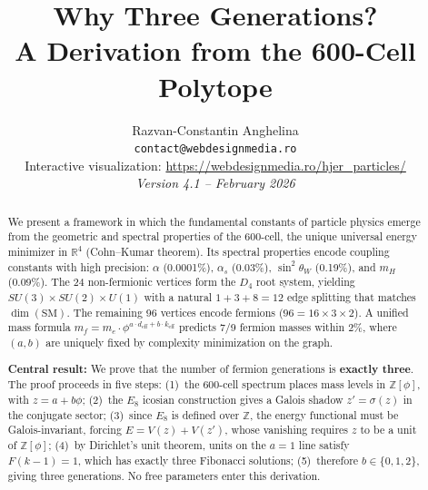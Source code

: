\documentclass[12pt,a4paper]{article}
\title{\textbf{Why Three Generations?\\
A Derivation from the 600-Cell Polytope}}
\author{
Razvan-Constantin Anghelina\\
\texttt{contact@webdesignmedia.ro}\\[0.3em]
Interactive visualization: \url{https://webdesignmedia.ro/hjer_particles/}\\[1em]
\textit{Version 4.1 -- February 2026}
}
\date{}
\begin{document}
\maketitle

\begin{abstract}
We present a framework in which the fundamental constants of particle physics emerge from the geometric and spectral properties of the 600-cell, the unique universal energy minimizer in $\mathbb{R}^4$ (Cohn--Kumar theorem). Its spectral properties encode coupling constants with high precision: $\alpha$ (0.0001\%), $\alpha_s$ (0.03\%), $\sin^2\theta_W$ (0.19\%), and $m_H$ (0.09\%). The 24 non-fermionic vertices form the $D_4$ root system, yielding $SU(3) \times SU(2) \times U(1)$ with a natural $1 + 3 + 8 = 12$ edge splitting that matches $\dim(\text{SM})$. The remaining 96 vertices encode fermions ($96 = 16 \times 3 \times 2$). A unified mass formula $m_f = m_e \cdot \phi^{a \cdot d_{\text{eff}} + b \cdot k_{\text{eff}}}$ predicts 7/9 fermion masses within 2\%, where $(a,b)$ are uniquely fixed by complexity minimization on the graph.

\textbf{Central result:} We prove that the number of fermion generations is \textbf{exactly three}. The proof proceeds in five steps: (1)~the 600-cell spectrum places mass levels in $\mathbb{Z}[\phi]$, with $z = a + b\phi$; (2)~the $E_8$ icosian construction gives a Galois shadow $z' = \sigma(z)$ in the conjugate sector; (3)~since $E_8$ is defined over $\mathbb{Z}$, the energy functional must be Galois-invariant, forcing $E = V(z) + V(z')$, whose vanishing requires $z$ to be a unit of $\mathbb{Z}[\phi]$; (4)~by Dirichlet's unit theorem, units on the $a=1$ line satisfy $F(k\!-\!1) = 1$, which has exactly three Fibonacci solutions; (5)~therefore $b \in \{0,1,2\}$, giving three generations. No free parameters enter this derivation.


\end{abstract}
\end{document}
